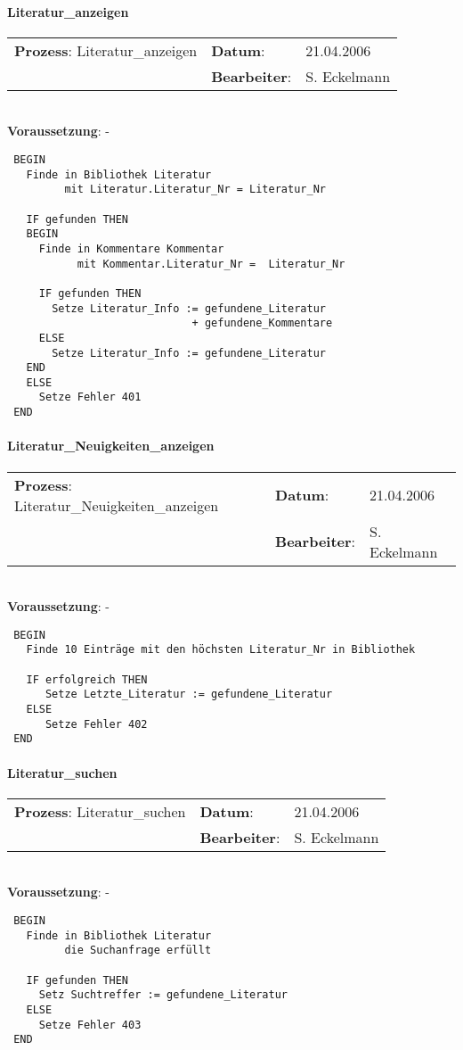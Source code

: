 \paragraph{Literatur\_anzeigen}
\begin{tabular}[t]{p{9.5cm}ll}
\textbf{Prozess}: Literatur\_anzeigen  	&\textbf{Datum}:      &21.04.2006\\
					&\textbf{Bearbeiter}: &S. Eckelmann\\
\end{tabular}

\hrulefill\\
\textbf{Voraussetzung}: -
\begin{verbatim}
 BEGIN
   Finde in Bibliothek Literatur
         mit Literatur.Literatur_Nr = Literatur_Nr

   IF gefunden THEN
   BEGIN
     Finde in Kommentare Kommentar
           mit Kommentar.Literatur_Nr =  Literatur_Nr

     IF gefunden THEN
       Setze Literatur_Info := gefundene_Literatur
                             + gefundene_Kommentare
     ELSE
       Setze Literatur_Info := gefundene_Literatur
   END
   ELSE
     Setze Fehler 401
 END
\end{verbatim}
\hrulefill

\paragraph{Literatur\_Neuigkeiten\_anzeigen}
\begin{tabular}[t]{p{9.5cm}ll}
\textbf{Prozess}: Literatur\_Neuigkeiten\_anzeigen  	&\textbf{Datum}:      &21.04.2006\\
					&\textbf{Bearbeiter}: &S. Eckelmann\\
\end{tabular}

\hrulefill\\
\textbf{Voraussetzung}: -
\begin{verbatim}
 BEGIN
   Finde 10 Einträge mit den höchsten Literatur_Nr in Bibliothek

   IF erfolgreich THEN
      Setze Letzte_Literatur := gefundene_Literatur
   ELSE
      Setze Fehler 402
 END
\end{verbatim}
\hrulefill


\paragraph{Literatur\_suchen}
\begin{tabular}[t]{p{9.5cm}ll}
\textbf{Prozess}: Literatur\_suchen  	&\textbf{Datum}:      &21.04.2006\\
					&\textbf{Bearbeiter}: &S. Eckelmann\\
\end{tabular}

\hrulefill\\
\textbf{Voraussetzung}: -
\begin{verbatim}
 BEGIN
   Finde in Bibliothek Literatur
         die Suchanfrage erfüllt
   
   IF gefunden THEN
     Setz Suchtreffer := gefundene_Literatur
   ELSE
     Setze Fehler 403
 END
\end{verbatim}
\hrulefill